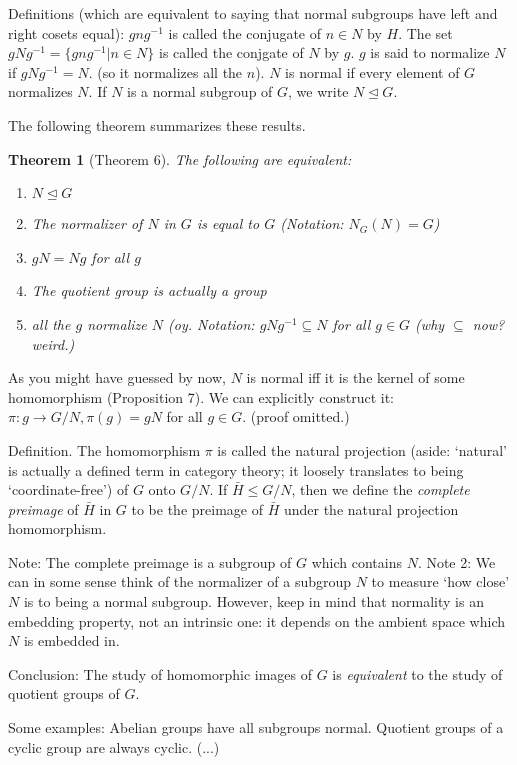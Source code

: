 \documentclass[1    0pt, answers]{exam} \renewcommand{\baselinestretch}{1.05}
\theoremstyle{plain}
\newtheorem{theorem}{Theorem}
\theoremstyle{definition}
\begin{document}
\begin{questions}
Definitions (which are equivalent to saying that normal subgroups have left and right cosets equal): $gng^{-1}$ is called the conjugate of $n \in N$ by $H$. The set $gNg^{-1} = \{ gng^{-1} | n \in N \}$ is called the conjgate of $N$ by $g$. $g$ is said to normalize $N$ if $gNg^{-1} = N$. (so it normalizes all the $n$). $N$ is normal if every element of $G$ normalizes $N$. If $N$ is a normal subgroup of $G$, we write $N \trianglelefteq G$.

The following theorem summarizes these results.
\begin{theorem}[Theorem 6]
The following are equivalent:
\begin{enumerate}
\item $N \trianglelefteq G$
\item The normalizer of $N$ in $G$ is equal to $G$ (Notation: $N_G(N) = G$)
\item $gN = Ng$ for all $g$
\item The quotient group is \emph{actually} a group
\item all the $g$ normalize $N$ (oy. Notation: $gNg^{-1} \subseteq N$ for all $g \in G$ (why $\subseteq$ now? weird.)
\end{enumerate}
\end{theorem}

As you might have guessed by now, $N$ is normal iff it is the kernel of some homomorphism (Proposition 7). We can explicitly construct it: $\pi: g \to G/N, \pi(g) = gN$ for all $g \in G$. (proof omitted.)

Definition. The homomorphism $\pi$ is called the natural projection (aside: `natural' is actually a defined term in category theory; it loosely translates to being `coordinate-free') of $G$ onto $G/N$. If $\bar{H} \leq G/N$, then we define the \emph{complete preimage} of $\bar{H}$ in $G$ to be the preimage of $\bar{H}$ under the natural projection homomorphism.

Note: The complete preimage is a subgroup of $G$ which contains $N$.
Note 2: We can in some sense think of the normalizer of a subgroup $N$ to measure `how close' $N$ is to being a normal subgroup. However, keep in mind that normality is an embedding property, not an intrinsic one: it depends on the ambient space which $N$ is embedded in. 

Conclusion: The study of homomorphic images of $G$ is \emph{equivalent} to the study of quotient groups of $G$.

Some examples: Abelian groups have all subgroups normal. Quotient groups of a cyclic group are always cyclic. (...)


\end{questions}
\end{document}
